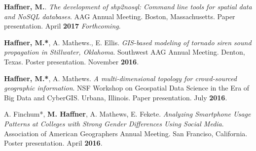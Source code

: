 \begin{cventries}
   \cventry
      {}
      {}
      {}
      {}
      {
        \begin{cvitems}
          \vspace{-2mm}
        \item {\textbf{Haffner, M.}.
            \textit{The development of shp2nosql: Command line tools for spatial
              data and NoSQL databases}. AAG Annual Meeting. Boston,
            Massachusetts. Paper presentation. April \textbf{2017} \textit{Forthcoming}.}
          \end{cvitems}
          }

   \cventry
      {}
      {}
      {}
      {}
      {
        \begin{cvitems}
          \vspace{-2mm}
            \item {\textbf{Haffner, M.*}, A. Mathews., E. Ellis.
                \textit{GIS-based modeling of tornado siren sound propagation in
                  Stillwater, Oklahoma}. Southwest AAG Annual Meeting. Denton,
                Texas. Poster  presentation. November \textbf{2016}.}
            \end{cvitems}
          }

   \cventry
      {}
      {}
      {}
      {}
      {
        \begin{cvitems}
          \vspace{-2mm}
        \item {\textbf{Haffner, M.*}, A. Mathews. \textit{A multi-dimensional topology for crowd-sourced geographic information}. NSF Workshop on Geospatial Data Science in the Era of Big Data and CyberGIS. Urbana, Illinois. Paper presentation. July \textbf{2016}.} 
          \end{cvitems}
        }

   \cventry
      {}
      {}
      {}
      {}
      {
        \begin{cvitems}
          \vspace{-2mm}
        \item A. Finchum*, {\textbf{M. Haffner}, A. Mathews, E. Fekete. \textit{Analyzing Smartphone Usage Patterns at Colleges with Strong Gender Differences Using Social Media}. Association of American Geographers Annual Meeting. San Franciso, California. Poster presentation. April \textbf{2016}.} 
            \end{cvitems}
            }


\end{cventries}
